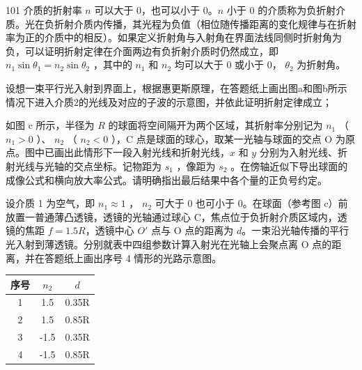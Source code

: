 \begin{problem}[第35届全国中学生物理竞赛决赛][负折射介质光学]{101}
    介质的折射率 $n$ 可以大于 0，也可以小于 0。$n$ 小于 0 的介质称为负折射介质。光在负折射介质内传播，其光程为负值（相位随传播距离的变化规律与在折射率为正的介质中的相反）。如果定义折射角与入射角在界面法线同侧时折射角为负，可以证明折射定律在介面两边有负折射介质时仍然成立，即 $n_{1}\sin\theta_{1}=n_{2}\sin\theta_{2}$ ，其中的 $n_{1}$ 和 $n_{2}$ 均可以大于 0 或小于 0， $\theta_{2}$ 为折射角。
    \begin{subproblem}
        设想一束平行光入射到界面上，根据惠更斯原理，在答题纸上画出图a和图b所示情况下进入介质2的光线及对应的子波的示意图，并依此证明折射定律成立；
    \end{subproblem}
    \begin{subproblem}
        如图 c 所示，半径为 $R$ 的球面将空间隔开为两个区域，其折射率分别记为 $n_{1}$ （ $n_{1}>0$ ）、 $n_{2}$ （ $n_{2}<0$ ），C 点是球面的球心，取某一光轴与球面的交点 O 为原点。图中已画出此情形下一段入射光线和折射光线，$x$ 和 $y$ 分别为入射光线、折射光线与光轴的交点坐标。记物距为 $s_{1}$ ，像距为 $s_{2}$ 。在傍轴近似下导出球面的成像公式和横向放大率公式。请明确指出最后结果中各个量的正负号约定。
    \end{subproblem}
    \begin{subproblem}
        设介质 1 为空气，即 $n_{1} \approx 1$ ， $n_{2}$ 可大于 0 也可小于 0。在球面（参考图 c）前放置一普通薄凸透镜，透镜的光轴通过球心 C，焦点位于负折射介质区域内，透镜的焦距 $f = 1.5R$，透镜中心 $O'$ 点与 O 点的距离为 $d$。一束沿光轴传播的平行光入射到薄透镜。分别就表中四组参数计算入射光在光轴上会聚点离 O 点的距离，并在答题纸上画出序号 4 情形的光路示意图。

        \begin{tabular}{|c|c|c|}
            \hline
            序号 & $n_2$ & $d$ \\
            \hline
            1 & 1.5 & 0.35R \\
            \hline
            2 & 1.5 & 0.85R \\
            \hline
            3 & -1.5 & 0.35R \\
            \hline
            4 & -1.5 & 0.85R \\
            \hline
        \end{tabular}
    \end{subproblem}
\end{problem}